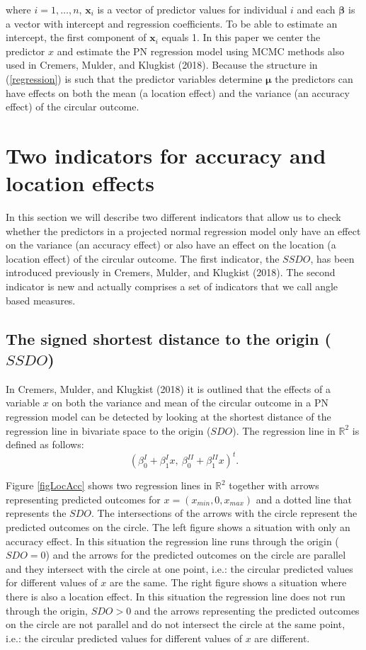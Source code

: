 \documentclass[11pt,]{article}
\begin{document}
where \(i = 1, \dots, n\), \(\boldsymbol{x}_{i}\) is a vector of
predictor values for individual \(i\) and each \(\boldsymbol{\beta}\) is
a vector with intercept and regression coefficients. To be able to
estimate an intercept, the first component of \(\boldsymbol{x}_{i}\)
equals 1. In this paper we center the predictor \(x\) and estimate the
PN regression model using MCMC methods also used in Cremers, Mulder, and
Klugkist (2018). Because the structure in (\ref{regression}) is such
that the predictor variables determine \(\boldsymbol{\mu}\) the
predictors can have effects on both the mean (a location effect) and the
variance (an accuracy effect) of the circular outcome.

\section{Two indicators for accuracy and location effects}\label{indicators}

In this section we will describe two different indicators that allow us
to check whether the predictors in a projected normal regression model
only have an effect on the variance (an accuracy effect) or also have an
effect on the location (a location effect) of the circular outcome. The
first indicator, the \(SSDO\), has been introduced previously in
Cremers, Mulder, and Klugkist (2018). The second indicator is new and
actually comprises a set of indicators that we call angle based
measures.

\subsection{The signed shortest distance to the origin ($SSDO$)}\label{measure1}

In Cremers, Mulder, and Klugkist (2018) it is outlined that the effects
of a variable \(x\) on both the variance and mean of the circular
outcome in a PN regression model can be detected by looking at the
shortest distance of the regression line in bivariate space to the
origin (\(SDO\)). The regression line in \(\mathbb{R}^2\) is defined as
follows: \[(\beta_0^I + \beta_1^Ix, \:  \beta_0^{II} +
\beta_1^{II}x)^t.\]

Figure \ref{figLocAcc} shows two regression lines in \(\mathbb{R}^2\)
together with arrows representing predicted outcomes for
\(x = (x_{min}, 0, x_{max})\) and a dotted line that represents the
\(SDO\). The intersections of the arrows with the circle represent the
predicted outcomes on the circle. The left figure shows a situation with
only an accuracy effect. In this situation the regression line runs
through the origin (\(SDO = 0\)) and the arrows for the predicted
outcomes on the circle are parallel and they intersect with the circle
at one point, i.e.: the circular predicted values for different values
of \(x\) are the same. The right figure shows a situation where there is
also a location effect. In this situation the regression line does not
run through the origin, \(SDO > 0\) and the arrows representing the
predicted outcomes on the circle are not parallel and do not intersect
the circle at the same point, i.e.: the circular predicted values for
different values of \(x\) are different.
\end{document}
